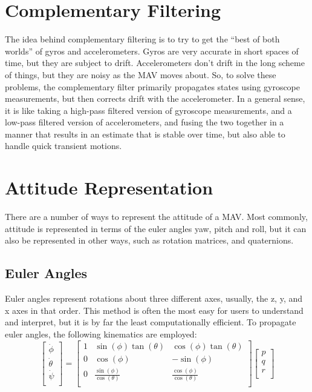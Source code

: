 \documentclass[paper=a4, fontsize=11pt]{scrartcl} %
\numberwithin{equation}{section} %
\numberwithin{figure}{section} %
\numberwithin{table}{section} %
\begin{document}
\section{Complementary Filtering}
The idea behind complementary filtering is to try to get the ``best of both worlds'' of gyros and accelerometers.  Gyros are very accurate in short spaces of time, but they are subject to drift.  Accelerometers don't drift in the long scheme of things, but they are noisy as the MAV moves about.  So, to solve these problems, the complementary filter primarily propagates states using gyroscope measurements, but then corrects drift with the accelerometer.  In a general sense, it is like taking a high-pass filtered version of gyroscope measurements, and a low-pass filtered version of accelerometers, and fusing the two together in a manner that results in an estimate that is stable over time, but also able to handle quick transient motions.

\section{Attitude Representation}
There are a number of ways to represent the attitude of a MAV.  Most commonly, attitude is represented in terms of the euler angles yaw, pitch and roll, but it can also be represented in other ways, such as rotation matrices, and quaternions.

\subsection{Euler Angles}
Euler angles represent rotations about three different axes, usually, the z, y, and x axes in that order.  This method is often the most easy for users to understand and interpret, but it is by far the least computationally efficient.  To propagate euler angles, the following kinematics are employed:
\begin{equation}
	\begin{bmatrix}
		\dot{\phi} \\
		\dot{\theta} \\
		\dot{\psi} \\
	\end{bmatrix}
	= 
	\begin{bmatrix}
		1 & \sin(\phi) \tan(\theta) & \cos(\phi)\tan(\theta) \\
		0 & \cos(\phi)              & -\sin(\phi) \\
		0 & \frac{\sin(\phi)}{\cos(\theta)} & \frac{\cos(\phi)}{\cos(\theta)}  \\
	\end{bmatrix}
	\begin{bmatrix}
		p \\
		q \\
		r \\
	\end{bmatrix}
\end{equation}
\end{document}
